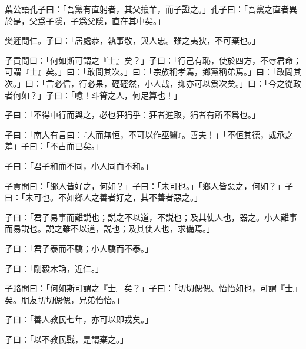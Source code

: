 葉公語孔子曰：「吾黨有直躬者，其父攘羊，而子證之。」孔子曰：「吾黨之直者異於是，父爲子隱，子爲父隱，直在其中矣。」

樊遲問仁。子曰：「居處恭，執事敬，與人忠。雖之夷狄，不可棄也。」

子貢問曰：「何如斯可謂之『士』矣？」子曰：「行己有恥，使於四方，不辱君命；可謂『士』矣。」曰：「敢問其次。」曰：「宗族稱孝焉，鄉黨稱弟焉。」曰：「敢問其次。」曰：「言必信，行必果，硜硜然，小人哉，抑亦可以爲次矣。」曰：「今之從政者何如？」子曰：「噫！斗筲之人，何足算也！」

子曰：「不得中行而與之，必也狂狷乎：狂者進取，狷者有所不爲也。」

子曰：「南人有言曰：『人而無恒，不可以作巫醫』。善夫！」「不恒其德，或承之羞」子曰：「不占而已矣。」

子曰：「君子和而不同，小人同而不和。」

子貢問曰：「鄉人皆好之，何如？」子曰：「未可也。」「鄉人皆惡之，何如？」子曰：「未可也。不如鄉人之善者好之，其不善者惡之。」

子曰：「君子易事而難説也；説之不以道，不説也；及其使人也，器之。小人難事而易説也。説之雖不以道，説也；及其使人也，求備焉。」

子曰：「君子泰而不驕；小人驕而不泰。」

子曰：「剛毅木訥，近仁。」

子路問曰：「何如斯可謂之『士』矣？」子曰：「切切偲偲、怡怡如也，可謂『士』矣。朋友切切偲偲，兄弟怡怡。」

子曰：「善人教民七年，亦可以即戎矣。」

子曰：「以不教民戰，是謂棄之。」
